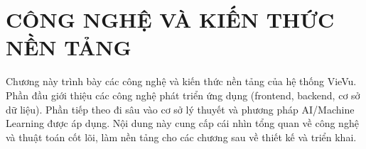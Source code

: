 \chapter{CÔNG NGHỆ VÀ KIẾN THỨC NỀN TẢNG}
Chương này trình bày các công nghệ và kiến thức nền tảng của hệ thống VieVu. Phần đầu giới thiệu các công nghệ phát triển ứng dụng (frontend, backend, cơ sở dữ liệu). Phần tiếp theo đi sâu vào cơ sở lý thuyết và phương pháp AI/Machine Learning được áp dụng. Nội dung này cung cấp cái nhìn tổng quan về công nghệ và thuật toán cốt lõi, làm nền tảng cho các chương sau về thiết kế và triển khai.



